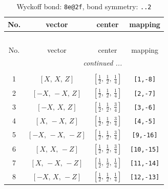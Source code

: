 \documentclass[fleqn,8pt]{jsarticle}
\begin{document}
\begin{longtable}{cccc}
\caption{Wyckoff bond: {\tt 8e@2f}, bond symmetry: {\tt ..2}}
 \\
 \hline \hline
No. & vector & center & mapping \\ \hline \endfirsthead

\multicolumn{3}{l}{\tablename\ \thetable{}} \\
 \hline \hline
No. & vector & center & mapping \\ \hline \endhead

 \hline \hline
\multicolumn{3}{r}{\footnotesize\it continued ...} \\ \endfoot

 \hline \hline
\multicolumn{3}{r}{} \\ \endlastfoot

1 & $\left[ X,\, X,\, Z \right]$ & $\left[ \frac{1}{2},\, \frac{1}{2},\, \frac{1}{4} \right]$ & {\tt [1,-8]} \\ \hline
2 & $\left[ - X,\, - X,\, Z \right]$ & $\left[ \frac{1}{2},\, \frac{1}{2},\, \frac{1}{4} \right]$ & {\tt [2,-7]} \\ \hline
3 & $\left[ - X,\, X,\, Z \right]$ & $\left[ \frac{1}{2},\, \frac{1}{2},\, \frac{3}{4} \right]$ & {\tt [3,-6]} \\ \hline
4 & $\left[ X,\, - X,\, Z \right]$ & $\left[ \frac{1}{2},\, \frac{1}{2},\, \frac{3}{4} \right]$ & {\tt [4,-5]} \\ \hline
5 & $\left[ - X,\, - X,\, - Z \right]$ & $\left[ \frac{1}{2},\, \frac{1}{2},\, \frac{3}{4} \right]$ & {\tt [9,-16]} \\ \hline
6 & $\left[ X,\, X,\, - Z \right]$ & $\left[ \frac{1}{2},\, \frac{1}{2},\, \frac{3}{4} \right]$ & {\tt [10,-15]} \\ \hline
7 & $\left[ X,\, - X,\, - Z \right]$ & $\left[ \frac{1}{2},\, \frac{1}{2},\, \frac{1}{4} \right]$ & {\tt [11,-14]} \\ \hline
8 & $\left[ - X,\, X,\, - Z \right]$ & $\left[ \frac{1}{2},\, \frac{1}{2},\, \frac{1}{4} \right]$ & {\tt [12,-13]} \\
\end{longtable}
\renewcommand{\arraystretch}{1.2}
\end{document}

